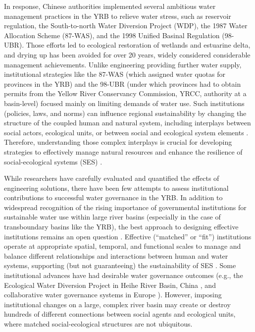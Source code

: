 In response, Chinese authorities implemented several ambitious water management practices in the YRB to relieve water stress, such as reservoir regulation, the South-to-north Water Diversion Project (WDP), the 1987 Water Allocation Scheme (87-WAS), and the 1998 Unified Basinal Regulation (98-UBR).
Those efforts led to ecological restoration of wetlands and estuarine delta, and drying up has been avoided for over 20 years, widely considered considerable management achievements.
Unlike engineering providing further water supply, institutional strategies like the 87-WAS (which assigned water quotas for provinces in the YRB) and the 98-UBR (under which provinces had to obtain permits from the Yellow River Conservancy Commission, YRCC, authority at a basin-level) focused mainly on limiting demands of water use.
Such institutions (policies, laws, and norms) can influence regional sustainability by changing the structure of the coupled human and natural system, including interplays between social actors, ecological units, or between social and ecological system elements
\cite{young2008,cumming2020b,lien2020, bodin2017b}.
Therefore, understanding those complex interplays is crucial for developing strategies to effectively manage natural resources and enhance the resilience of social-ecological systems (SES) \cite{kluger2020}.

While researchers have carefully evaluated and quantified the effects of engineering solutions, there have been few attempts to assess institutional contributions to successful water governance in the YRB.
In addition to widespread recognition of the rising importance of governmental institutions for sustainable water use within large river basins (especially in the case of transboundary basins like the YRB), the best approach to designing effective institutions remains an open question \cite{agrawal2003, persha2011, agrawal2001}.
Effective (``matched'' or ``fit'') institutions operate at appropriate spatial, temporal, and functional scales to manage and balance different relationships and interactions between human and water systems, supporting (but not guaranteeing) the sustainability of SES \cite{epstein2015, wang2019d}.
Some institutional advances have had desirable water governance outcomes (e.g., the Ecological Water Diversion Project in Heihe River Basin, China \cite{wang2019d}, and collaborative water governance systems in Europe \cite{green2013}).
However, imposing institutional changes on a large, complex river basin may create or destroy hundreds of different connections between social agents and ecological units, where matched social-ecological structures are not ubiquitous.

